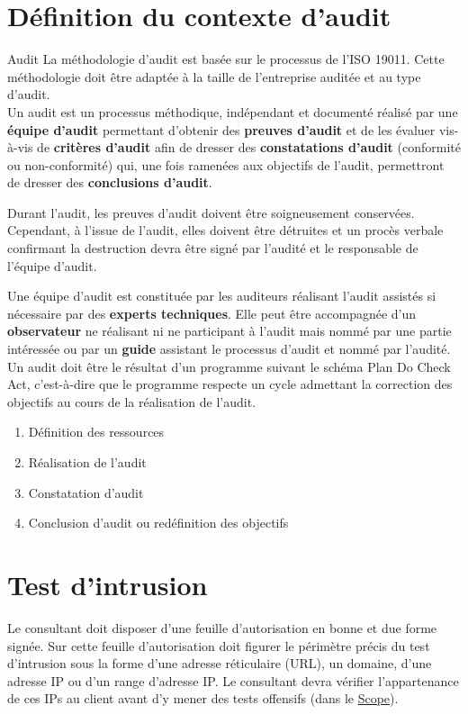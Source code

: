 \documentclass[twoside,a4paper,12pt,titlepage]{book}
\begin{document}
\chapter*{Définition du contexte d'audit}
\begin{Define}{Audit}
La méthodologie d'audit est basée sur le processus de l'ISO 19011. Cette méthodologie doit être adaptée à la taille de l'entreprise auditée et au type d'audit.\\
Un audit est un processus méthodique, indépendant et documenté réalisé par une \textbf{équipe d'audit} permettant d'obtenir des \textbf{preuves d'audit} et de les évaluer vis-à-vis de \textbf{critères d'audit} afin de dresser des \textbf{constatations d'audit} (conformité ou non-conformité) qui, une fois ramenées aux objectifs de l'audit, permettront de dresser des \textbf{conclusions d'audit}.
\end{Define}
\begin{Warning}
Durant l'audit, les preuves d'audit doivent être soigneusement conservées. Cependant, à l'issue de l'audit, elles doivent être détruites et un procès verbale confirmant la destruction devra être signé par l'audité et le responsable de l'équipe d'audit.
\end{Warning}
Une équipe d'audit est constituée par les auditeurs réalisant l'audit assistés si nécessaire par des \textbf{experts techniques}. Elle peut être accompagnée d'un \textbf{observateur} ne réalisant ni ne participant à l'audit mais nommé par une partie intéressée ou par un \textbf{guide} assistant le processus d'audit et nommé par l'audité.\newline\newline
Un audit doit être le résultat d'un programme suivant le schéma Plan Do Check Act, c'est-à-dire que le programme respecte un cycle admettant la correction des objectifs au cours de la réalisation de l'audit. \begin{enumerate}
\item Définition des ressources
\item Réalisation de l'audit
\item Constatation d'audit
\item Conclusion d'audit ou redéfinition des objectifs
\end{enumerate}

\chapter{Test d'intrusion}
\begin{Pre}Le consultant doit disposer d'une feuille d'autorisation en bonne et due forme signée. Sur cette feuille d'autorisation doit figurer le périmètre précis du test d'intrusion sous la forme d'une adresse réticulaire (\gls{URL}), un domaine, d'une adresse IP ou d'un range d'adresse IP. Le consultant devra vérifier l'appartenance de ces IPs au client avant d'y mener des tests offensifs (dans le \hyperref[Scope]{Scope}).\end{Pre}
\end{document}
